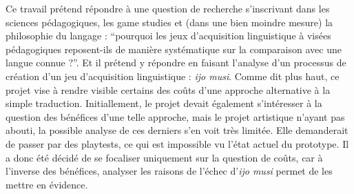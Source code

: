 \documentclass{scrartcl}
\begin{document}
	Ce travail prétend répondre à une question de recherche s'inscrivant dans les sciences pédagogiques, les game studies et (dans une bien moindre mesure) la philosophie du langage : “pourquoi les jeux d’acquisition linguistique à visées pédagogiques reposent-ils de manière systématique sur la comparaison avec une langue connue ?”. Et il prétend y répondre en faisant l'analyse d'un processus de création d'un jeu d'acquisition linguistique : \textit{ijo musi}. Comme dit plus haut, ce projet vise à rendre visible certains des coûts d'une approche alternative à la simple traduction. Initiallement, le projet devait également s'intéresser à la question des bénéfices d'une telle approche, mais le projet artistique n'ayant pas abouti, la possible analyse de ces derniers s'en voit très limitée.  Elle demanderait de passer par des playtests, ce qui est impossible vu l'état actuel du prototype. Il a donc été décidé de se focaliser uniquement sur la question de coûts, car à l'inverse des bénéfices, analyser les raisons de l'échec d'\textit{ijo musi} permet de les mettre en évidence.\\ 
	
\end{document}
